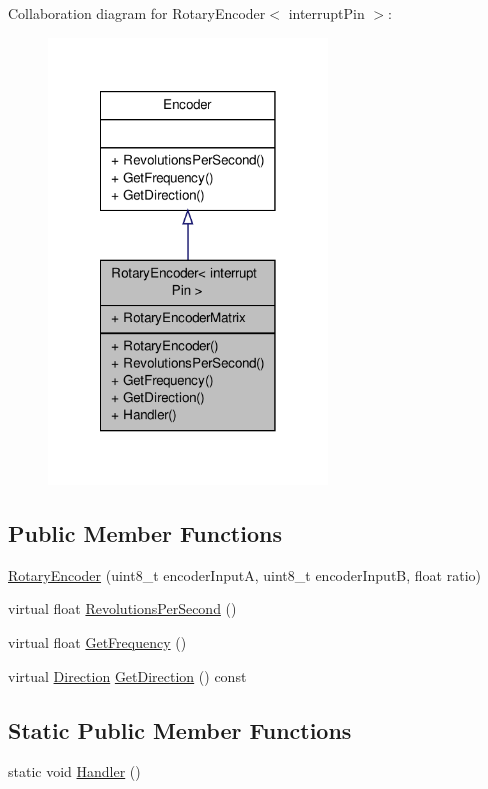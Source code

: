 Collaboration diagram for Rotary\-Encoder$<$ interrupt\-Pin $>$\-:
\nopagebreak
\begin{figure}[H]
\begin{center}
\leavevmode
\includegraphics[width=210pt]{class_rotary_encoder__coll__graph}
\end{center}
\end{figure}
\subsection*{Public Member Functions}
\begin{DoxyCompactItemize}
\item 
\hyperlink{class_rotary_encoder_a9c59eaec8c45def05d639a22324d60c5}{Rotary\-Encoder} (uint8\-\_\-t encoder\-Input\-A, uint8\-\_\-t encoder\-Input\-B, float ratio)
\item 
virtual float \hyperlink{class_rotary_encoder_a7ec02990f0ffb7bb62a3a76f0fd64ade}{Revolutions\-Per\-Second} ()
\item 
virtual float \hyperlink{class_rotary_encoder_a3dea9166b76dad99ee708c4ff1fde9f8}{Get\-Frequency} ()
\item 
virtual \hyperlink{class_encoder_aa7c4648a7ebc9e651c25c2d450a58213}{Direction} \hyperlink{class_rotary_encoder_aa62141a77e01d0d44706f3b421e3ae25}{Get\-Direction} () const 
\end{DoxyCompactItemize}
\subsection*{Static Public Member Functions}
\begin{DoxyCompactItemize}
\item 
static void \hyperlink{class_rotary_encoder_ad884c21ff3f1c2e382bc3a72596e1ec4}{Handler} ()
\end{DoxyCompactItemize}
